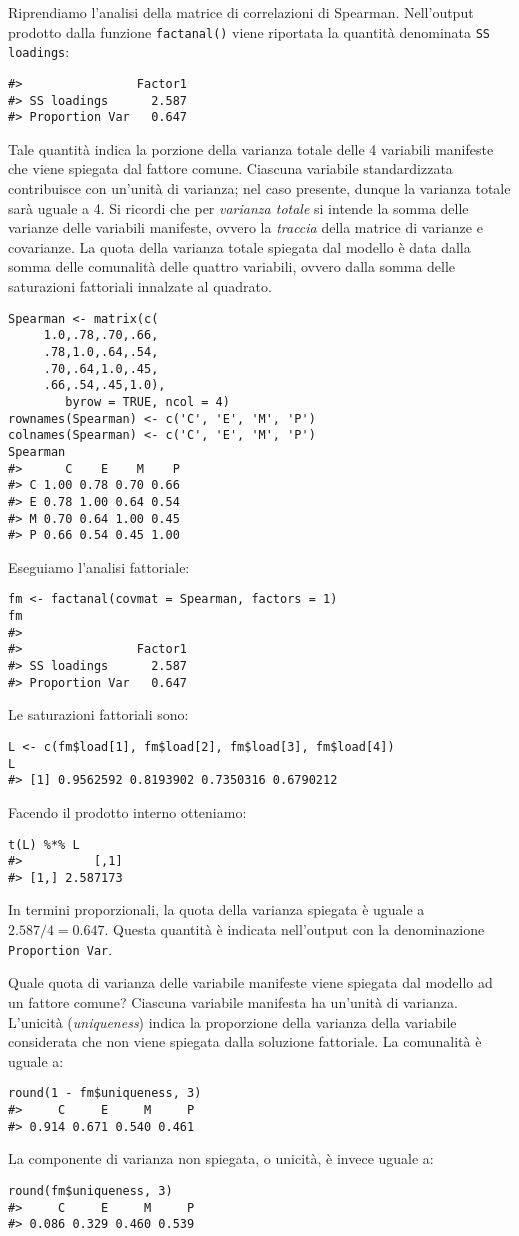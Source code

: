 \begin{exmp} 
Riprendiamo l'analisi della matrice di correlazioni di Spearman. 
Nell'output prodotto dalla funzione {\tt factanal()} viene riportata la quantità
denominata {\tt SS loadings}: 
\begin{lstlisting}
#>                Factor1
#> SS loadings      2.587
#> Proportion Var   0.647
\end{lstlisting}
Tale quantità indica la porzione della varianza totale delle 4 variabili manifeste che viene spiegata dal fattore comune.  Ciascuna variabile standardizzata contribuisce con un'unità di
varianza; nel caso presente, dunque la varianza totale sarà uguale a 4. 
 Si ricordi che per \textit{varianza totale} si intende la somma
  delle varianze delle variabili manifeste, ovvero la \textit{traccia}
  della matrice di varianze e covarianze.
  La quota della varianza totale spiegata dal modello è data dalla
somma delle comunalità delle quattro variabili, ovvero dalla somma
delle saturazioni fattoriali innalzate al quadrato.  
\begin{lstlisting}
Spearman <- matrix(c(
     1.0,.78,.70,.66,
     .78,1.0,.64,.54,
     .70,.64,1.0,.45,
     .66,.54,.45,1.0),
        byrow = TRUE, ncol = 4)
rownames(Spearman) <- c('C', 'E', 'M', 'P')
colnames(Spearman) <- c('C', 'E', 'M', 'P')
Spearman
#>      C    E    M    P
#> C 1.00 0.78 0.70 0.66
#> E 0.78 1.00 0.64 0.54
#> M 0.70 0.64 1.00 0.45
#> P 0.66 0.54 0.45 1.00
\end{lstlisting}
Eseguiamo l'analisi fattoriale:
\begin{lstlisting}
fm <- factanal(covmat = Spearman, factors = 1)
fm
#> 
#>                Factor1
#> SS loadings      2.587
#> Proportion Var   0.647
\end{lstlisting}
 Le saturazioni fattoriali sono:
\begin{lstlisting}
L <- c(fm$load[1], fm$load[2], fm$load[3], fm$load[4])
L
#> [1] 0.9562592 0.8193902 0.7350316 0.6790212
\end{lstlisting}
Facendo il prodotto interno otteniamo:
\begin{lstlisting}
t(L) %*% L
#>          [,1]
#> [1,] 2.587173
\end{lstlisting}
In termini proporzionali, la quota della varianza spiegata è uguale a $2.587 / 4 = 0.647$. Questa quantità è indicata nell'output con la denominazione {\tt Proportion Var}.
\end{exmp} 

Quale quota di varianza delle variabile manifeste viene spiegata dal modello ad un fattore comune?   Ciascuna variabile
manifesta ha un'unità di varianza. L'unicità (\textit{uniqueness})
indica la proporzione della varianza della variabile considerata che
non viene spiegata dalla soluzione fattoriale.
La comunalità è  uguale a: 
\begin{lstlisting}
round(1 - fm$uniqueness, 3)
#>     C     E     M     P 
#> 0.914 0.671 0.540 0.461 
\end{lstlisting}
 La componente di varianza non spiegata, o unicità, è invece uguale a: 
\begin{lstlisting}
round(fm$uniqueness, 3)
#>     C     E     M     P 
#> 0.086 0.329 0.460 0.539
\end{lstlisting}


